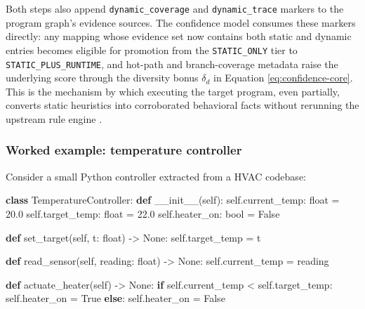 \documentclass[
]{article}
\newenvironment{Shaded}{}{}
\newcommand{\BuiltInTok}[1]{\textcolor[rgb]{0.00,0.50,0.00}{#1}}
\newcommand{\ControlFlowTok}[1]{\textcolor[rgb]{0.00,0.44,0.13}{\textbf{#1}}}
\newcommand{\FloatTok}[1]{\textcolor[rgb]{0.25,0.63,0.44}{#1}}
\newcommand{\FunctionTok}[1]{\textcolor[rgb]{0.02,0.16,0.49}{#1}}
\newcommand{\KeywordTok}[1]{\textcolor[rgb]{0.00,0.44,0.13}{\textbf{#1}}}
\newcommand{\NormalTok}[1]{#1}
\newcommand{\OperatorTok}[1]{\textcolor[rgb]{0.40,0.40,0.40}{#1}}
\newcommand{\VariableTok}[1]{\textcolor[rgb]{0.10,0.09,0.49}{#1}}
\begin{document}
Both steps also append \texttt{dynamic\_coverage} and
\texttt{dynamic\_trace} markers to the program graph's evidence sources.
The confidence model consumes these markers directly: any mapping whose
evidence set now contains both static and dynamic entries becomes
eligible for promotion from the \texttt{STATIC\_ONLY} tier to
\texttt{STATIC\_PLUS\_RUNTIME}, and hot-path and branch-coverage
metadata raise the underlying score through the diversity bonus
\(\delta_d\) in Equation \ref{eq:confidence-core}. This is the mechanism
by which executing the target program, even partially, converts static
heuristics into corroborated behavioral facts without rerunning the
upstream rule engine \citep{allamanis2018survey}.

\subsubsection{Worked example: temperature
controller}\label{worked-example-temperature-controller}

Consider a small Python controller extracted from a HVAC codebase:

\begin{Shaded}
\begin{Highlighting}[]
\KeywordTok{class}\NormalTok{ TemperatureController:}
    \KeywordTok{def} \FunctionTok{\_\_init\_\_}\NormalTok{(}\VariableTok{self}\NormalTok{):}
        \VariableTok{self}\NormalTok{.current\_temp: }\BuiltInTok{float} \OperatorTok{=} \FloatTok{20.0}
        \VariableTok{self}\NormalTok{.target\_temp: }\BuiltInTok{float} \OperatorTok{=} \FloatTok{22.0}
        \VariableTok{self}\NormalTok{.heater\_on: }\BuiltInTok{bool} \OperatorTok{=} \VariableTok{False}

    \KeywordTok{def}\NormalTok{ set\_target(}\VariableTok{self}\NormalTok{, t: }\BuiltInTok{float}\NormalTok{) }\OperatorTok{{-}\textgreater{}} \VariableTok{None}\NormalTok{:}
        \VariableTok{self}\NormalTok{.target\_temp }\OperatorTok{=}\NormalTok{ t}

    \KeywordTok{def}\NormalTok{ read\_sensor(}\VariableTok{self}\NormalTok{, reading: }\BuiltInTok{float}\NormalTok{) }\OperatorTok{{-}\textgreater{}} \VariableTok{None}\NormalTok{:}
        \VariableTok{self}\NormalTok{.current\_temp }\OperatorTok{=}\NormalTok{ reading}

    \KeywordTok{def}\NormalTok{ actuate\_heater(}\VariableTok{self}\NormalTok{) }\OperatorTok{{-}\textgreater{}} \VariableTok{None}\NormalTok{:}
        \ControlFlowTok{if} \VariableTok{self}\NormalTok{.current\_temp }\OperatorTok{\textless{}} \VariableTok{self}\NormalTok{.target\_temp:}
            \VariableTok{self}\NormalTok{.heater\_on }\OperatorTok{=} \VariableTok{True}
        \ControlFlowTok{else}\NormalTok{:}
            \VariableTok{self}\NormalTok{.heater\_on }\OperatorTok{=} \VariableTok{False}
\end{Highlighting}
\end{Shaded}
\end{document}
